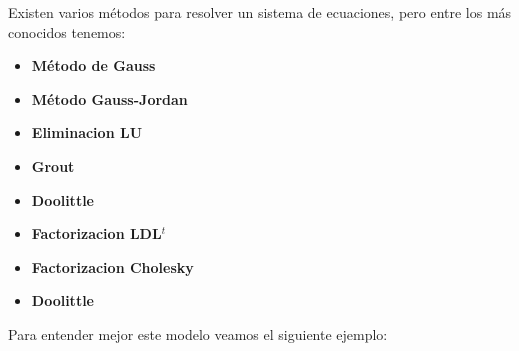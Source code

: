 \documentclass[10pt,a4paper]{article}
\begin{document}
\begin{multicols}{2}
\begin{itemize}
 Existen varios métodos para resolver un sistema de ecuaciones, pero entre los más conocidos tenemos:
 \begin{itemize}
 	\item \textbf{Método de Gauss}
 	\item \textbf{Método Gauss-Jordan} 
	\item \textbf{Eliminacion LU}
	\item \textbf{Grout}
	\item \textbf{Doolittle}
	\item \textbf{Factorizacion LDL$^t$}
	\item \textbf{Factorizacion Cholesky}
	\item \textbf{Doolittle}
 	\end{itemize}
\end{itemize}

Para entender mejor este modelo veamos el siguiente ejemplo:


\end{multicols}
\end{document}
